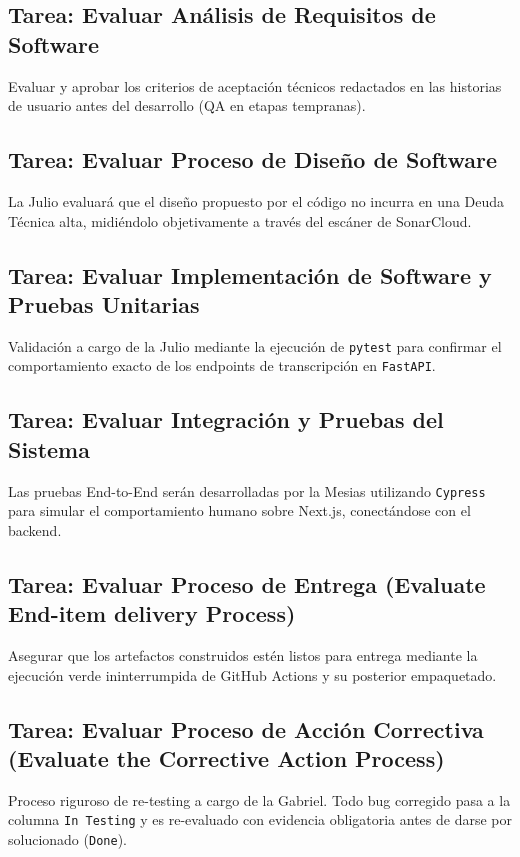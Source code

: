 \documentclass[12pt,a4paper]{article}
\begin{document}
\subsection{Tarea: Evaluar Análisis de Requisitos de Software}
Evaluar y aprobar los criterios de aceptación técnicos redactados en las historias de usuario antes del desarrollo (QA en etapas tempranas).

\subsection{Tarea: Evaluar Proceso de Diseño de Software}
La Julio evaluará que el diseño propuesto por el código no incurra en una Deuda Técnica alta, midiéndolo objetivamente a través del escáner de SonarCloud.

\subsection{Tarea: Evaluar Implementación de Software y Pruebas Unitarias}
Validación a cargo de la Julio mediante la ejecución de \texttt{pytest} para confirmar el comportamiento exacto de los endpoints de transcripción en \texttt{FastAPI}.

\subsection{Tarea: Evaluar Integración y Pruebas del Sistema}
Las pruebas End-to-End serán desarrolladas por la Mesias utilizando \texttt{Cypress} para simular el comportamiento humano sobre Next.js, conectándose con el backend.

\subsection{Tarea: Evaluar Proceso de Entrega (Evaluate End-item delivery Process)}
Asegurar que los artefactos construidos estén listos para entrega mediante la ejecución verde ininterrumpida de GitHub Actions y su posterior empaquetado.

\subsection{Tarea: Evaluar Proceso de Acción Correctiva (Evaluate the Corrective Action Process)}
Proceso riguroso de re-testing a cargo de la Gabriel. Todo bug corregido pasa a la columna \texttt{In Testing} y es re-evaluado con evidencia obligatoria antes de darse por solucionado (\texttt{Done}).
\end{document}
